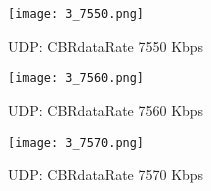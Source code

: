 \documentclass[12pt, fleqn]{article}
\begin{document}
\begin{figure}[H]
    \centering
    \texttt{[image: 3\_7550.png]}
    \caption{UDP: CBRdataRate 7550 Kbps}
\end{figure}
\begin{figure}[H]
    \centering
    \texttt{[image: 3\_7560.png]}
    \caption{UDP: CBRdataRate 7560 Kbps}
\end{figure}
\begin{figure}[H]
    \centering
    \texttt{[image: 3\_7570.png]}
    \caption{UDP: CBRdataRate 7570 Kbps}
\end{figure}
\end{document}
